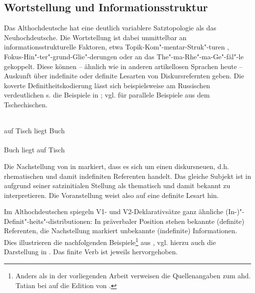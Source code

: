 \subsection{Wortstellung und Informationsstruktur} \label{is-ahd.}

Das Althochdeutsche hat eine deutlich variablere Satztopologie als das Neuhochdeutsche. Die Wortstellung ist dabei unmittelbar an informationsstrukturelle Faktoren, etwa  Topik-Kom"-mentar-Struk"-turen
\parencite{Hinterholzl2005,Ramers2005,Solf2008}, Fokus-Hin"-ter"-grund-Glie"-derungen \parencite{Petrova2009} oder an das The"-ma-Rhe"-ma-Ge"-fäl"-le \parencite{Leiss2000} gekoppelt. Diese können -- ähnlich wie in anderen artikellosen Sprachen heute -- Auskunft über indefinite oder definite Lesarten von Diskursrefernten geben. Die koverte Definitheitskodierung lässt sich beispielsweise am Russischen verdeutlichen s. die Beispiele in  \parencite[s.][191]{Szczepaniak2015};  vgl.  \textcite[5]{Leiss2000} für parallele Beispiele aus dem Tschechischen. 

\begin{exe}
\settowidth{}
	\ex \label{ex:is}   
	\begin{xlist}
		\ex \label{ex:is-indef} 
		\gll {}   \\
		auf Tisch liegt Buch\\
		\trans {}
		\ex \label{ex:is-def} 
		\gll {}   \\
		Buch liegt auf Tisch\\
		\trans {}
	\end{xlist}
\end{exe}

\noindent
Die Nachstellung von  in  markiert, dass es sich um einen diskursneuen, d.h. rhematischen und damit indefiniten Referenten handelt. Das gleiche Subjekt ist in  aufgrund seiner  satzinitialen Stellung als thematisch und damit bekannt zu interpretieren. Die Voranstellung weist also auf eine definite Lesart hin.

Im Althochdeutschen spiegeln V1- und V2-Deklarativsätze ganz ähnliche (In-)"-Definit"-heits"-distributionen: In präverbaler Position stehen bekannte (definite) Referenten, die Nachstellung markiert unbekannte (indefinite) Informationen. Dies illustrieren die nachfolgenden Beispiele\footnote{Anders als in der vorliegenden Arbeit verweisen die Quellenangaben zum ahd. Tatian bei \textcite{Hinterholzl2010} auf die Edition von \textcite{Masser1994}.} aus \textcite[316]{Hinterholzl2010}, vgl. hierzu auch die Darstellung in \textcite[46f.]{Ferraresi2014}. Das finite Verb ist jeweils hervorgehoben.

